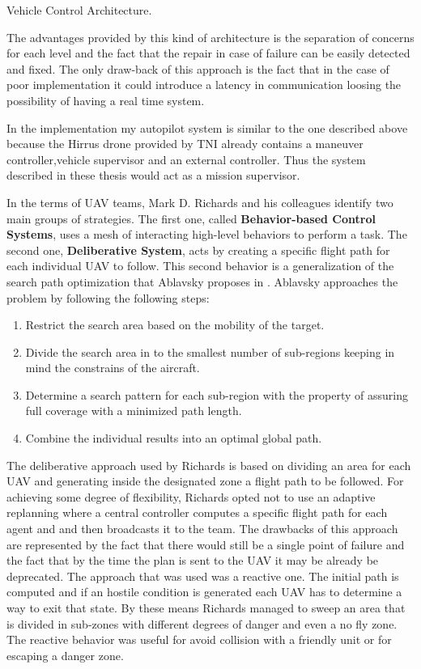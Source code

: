 {Vehicle Control Architecture.}

\newpage
The advantages provided by this kind of architecture is the separation of
concerns for each level and the fact that the repair in case of failure can be
easily detected and fixed. The only draw-back of this approach is the fact
that in the case of poor implementation it could introduce a latency in communication
loosing the possibility of having a real time system.

In the implementation my autopilot system is similar to the one described above 
because the Hirrus drone \cite{hirrus} provided by TNI already contains
a maneuver controller,vehicle supervisor  and an external controller. Thus the
system described in these thesis would act as a mission supervisor.

In the terms of UAV teams, Mark D. Richards and his colleagues \cite{cooperative}
identify two main groups of strategies. The first one, called \textbf{Behavior-based
Control Systems}, uses a mesh of interacting high-level behaviors to perform a 
task. The second one, \textbf{Deliberative System}, acts by creating a specific
flight path for each individual UAV to follow. This second behavior is a 
generalization of the search path optimization that  Ablavsky proposes in 
  \cite{path-optimization}. Ablavsky approaches the problem by following the 
following steps:

\begin{enumerate}
\item Restrict the search area based on the mobility of the target.
\item Divide the search area in to the smallest number of sub-regions keeping in
mind the constrains of the aircraft.
\item Determine a search pattern for each sub-region with the property of assuring
full coverage with a minimized path length.
\item Combine the individual results into an optimal global path.
\end{enumerate}

The deliberative approach used by Richards is based on dividing an area for 
each UAV and generating inside the designated zone a flight path to be followed.
For achieving some degree of flexibility, Richards opted not to use an adaptive
replanning where a central controller computes a specific flight path for each
agent and and then broadcasts it to the team. The drawbacks of this approach are
represented by the fact that there would still be a single point of failure and
the fact that by the time the plan is sent to the UAV it may be already be 
deprecated. The approach that was used was a reactive one. The initial path
is computed and if an hostile condition is generated each UAV has to determine
a way to exit that state. By these means Richards managed to sweep an area
that is divided in sub-zones with different degrees of danger and even a no fly
zone. The reactive behavior was useful for avoid collision with a friendly unit
or for escaping a danger zone.

